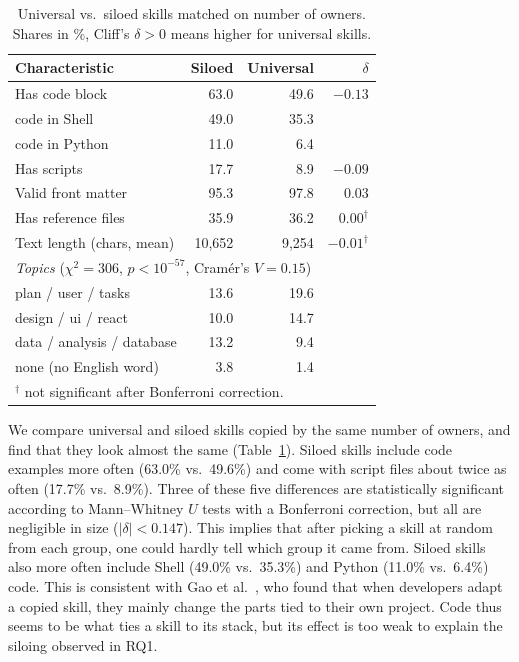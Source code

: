 \begin{table}[t]
\caption{Universal vs.\ siloed skills matched on number of owners. Shares in \%, Cliff's $\delta > 0$ means higher for universal skills.}
\label{tab:rq2}
\centering
\begin{tabular}{lrrr}
\toprule
Characteristic & Siloed & Universal & $\delta$ \\
\midrule
Has code block & 63.0 & 49.6 & $-0.13$ \\
\quad code in Shell & 49.0 & 35.3 & \\
\quad code in Python & 11.0 & 6.4 & \\
Has scripts & 17.7 & 8.9 & $-0.09$ \\
Valid front matter & 95.3 & 97.8 & $0.03$ \\
Has reference files & 35.9 & 36.2 & $0.00^{\dagger}$ \\
Text length (chars, mean) & 10,652 & 9,254 & $-0.01^{\dagger}$ \\
\midrule
\multicolumn{4}{l}{\textit{Topics} ($\chi^2 = 306$, $p < 10^{-57}$, Cram\'er's $V = 0.15$)} \\
plan / user / tasks & 13.6 & 19.6 & \\
design / ui / react & 10.0 & 14.7 & \\
data / analysis / database & 13.2 & 9.4 & \\
none (no English word) & 3.8 & 1.4 & \\
\bottomrule
\multicolumn{4}{l}{\footnotesize $^{\dagger}$ not significant after Bonferroni correction.}
\end{tabular}
\end{table}

We compare universal and siloed skills copied by the same number of owners, and find that they look almost the same (Table~\ref{tab:rq2}). Siloed skills include code examples more often (63.0\% vs.\ 49.6\%) and come with script files about twice as often (17.7\% vs.\ 8.9\%). Three of these five differences are statistically significant according to Mann--Whitney $U$ tests with a Bonferroni correction, but all are negligible in size ($|\delta| < 0.147$). This implies that after picking a skill at random from each group, one could hardly tell which group it came from. Siloed skills also more often include Shell (49.0\% vs.\ 35.3\%) and Python (11.0\% vs.\ 6.4\%) code. This is consistent with Gao et al.~\cite{gao2026registry}, who found that when developers adapt a copied skill, they mainly change the parts tied to their own project. Code thus seems to be what ties a skill to its stack, but its effect is too weak to explain the siloing observed in RQ1.

